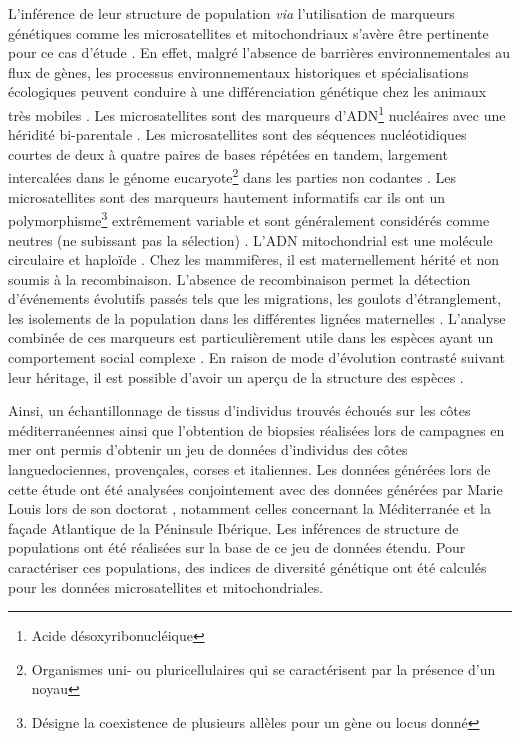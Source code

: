 \documentclass[a4paper,12pt,twoside]{article}\usepackage[]{graphicx}\usepackage[]{color}
\begin{document}
\begin {bibunit} [newbst]
L'inférence de leur structure de population \emph{via} l'utilisation de marqueurs génétiques comme les microsatellites et mitochondriaux s'avère être pertinente pour ce cas d'étude \citep{natoli2004molecular}. En effet, malgré l'absence de barrières environnementales au flux de gènes, les processus environnementaux historiques et spécialisations écologiques peuvent conduire à une différenciation génétique chez les animaux très mobiles \citep{natoli2005habitat, louis2014}. Les microsatellites sont des marqueurs d'ADN\footnote{Acide désoxyribonucléique} nucléaires avec une héridité bi-parentale \citep{jarne1996microsatellites}. Les microsatellites sont des séquences nucléotidiques courtes de deux à quatre paires de bases répétées en tandem, largement intercalées dans le génome eucaryote\footnote{Organismes uni- ou pluricellulaires qui se caractérisent par la présence d'un noyau} dans les parties non codantes \citep{estoup2002homoplasy}. Les microsatellites sont des marqueurs hautement informatifs car ils ont un polymorphisme\footnote{Désigne la coexistence de plusieurs allèles pour un gène ou locus donné} extrêmement variable et sont généralement considérés comme neutres (ne subissant pas la sélection) \citep{jarne1996microsatellites}. L'ADN mitochondrial est une molécule circulaire et haploïde \citep{avise1987intraspecific}. Chez les mammifères, il est maternellement hérité et non soumis à la recombinaison. L'absence de recombinaison permet la détection d'événements évolutifs passés tels que les migrations, les goulots d'étranglement, les isolements de la population dans les différentes lignées maternelles \citep{avise1987intraspecific, excoffier1992analysis}. L'analyse combinée de ces marqueurs est particulièrement utile dans les espèces ayant un comportement social complexe \citep{natoli2004molecular}. En raison de mode d'évolution contrasté suivant leur héritage, il est possible d'avoir un aperçu de la structure des espèces \citep{natoli2005habitat}.

Ainsi, un échantillonnage de tissus d'individus trouvés échoués sur les côtes méditerranéennes ainsi que l'obtention de biopsies réalisées lors de campagnes en mer ont permis d'obtenir un jeu de données d'individus des côtes languedociennes, provençales, corses et italiennes. Les données générées lors de cette étude ont été analysées conjointement avec des données générées par Marie Louis lors de son doctorat \citep{phdLouis2014}, notamment celles concernant la Méditerranée et la façade Atlantique de la Péninsule Ibérique. Les inférences de structure de populations ont été réalisées sur la base de ce jeu de données étendu. Pour caractériser ces populations, des indices de diversité génétique ont été calculés pour les données microsatellites et mitochondriales.


\end{bibunit}
\end{document}
